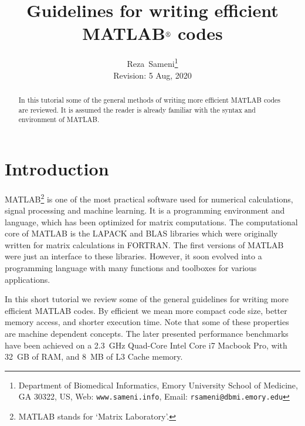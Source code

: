 \documentclass[10pt,a4paper]{article}
\begin{document}
\title{Guidelines for writing efficient MATLAB$^{\text{\small{\textregistered}}}$ codes}
\author{Reza~Sameni\footnote{Department of Biomedical Informatics, Emory University School of Medicine, GA 30322, US, Web: \texttt{www.sameni.info}, Email: \texttt{rsameni@dbmi.emory.edu}}\\
Revision: 5 Aug, 2020}
\date{}
\maketitle
\thispagestyle{empty}
\begin{abstract}
In this tutorial some of the general methods of writing more efficient MATLAB codes are reviewed. It is assumed the reader is already familiar with the syntax and environment of MATLAB.
\end{abstract}
\section{Introduction}
\label{sec:introduction}
MATLAB\footnote{MATLAB stands for `Matrix Laboratory'.} is one of the most practical software used for numerical calculations, signal processing and machine learning. It is a programming environment and language, which has been optimized for matrix computations. The computational core of MATLAB is the LAPACK and BLAS libraries which were originally written for matrix calculations in FORTRAN. The first versions of MATLAB were just an interface to these libraries. However, it soon evolved into a programming language with many functions and toolboxes for various applications.

In this short tutorial we review some of the general guidelines for writing more efficient MATLAB codes. By efficient we mean more compact code size, better memory access, and shorter execution time. Note that some of these properties are machine dependent concepts. The later presented performance benchmarks have been achieved on a 2.3~GHz Quad-Core Intel Core i7 Macbook Pro, with 32~GB of RAM, and 8~MB of L3 Cache memory.
\end{document}
